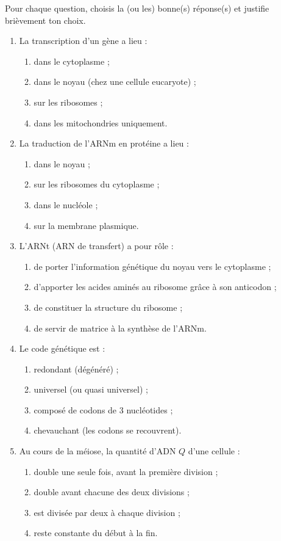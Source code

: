 \documentclass[11pt]{article}
\begin{document}
\begin{exercice}
Pour chaque question, choisis la (ou les) bonne(s) réponse(s) et justifie brièvement ton choix.
\begin{enumerate}
\item La transcription d'un gène a lieu :
\begin{enumerate}
\item dans le cytoplasme ;
\item dans le noyau (chez une cellule eucaryote) ;
\item sur les ribosomes ;
\item dans les mitochondries uniquement.
\end{enumerate}
\item La traduction de l'ARNm en protéine a lieu :
\begin{enumerate}
\item dans le noyau ;
\item sur les ribosomes du cytoplasme ;
\item dans le nucléole ;
\item sur la membrane plasmique.
\end{enumerate}
\item L'ARNt (ARN de transfert) a pour rôle :
\begin{enumerate}
\item de porter l'information génétique du noyau vers le cytoplasme ;
\item d'apporter les acides aminés au ribosome grâce à son anticodon ;
\item de constituer la structure du ribosome ;
\item de servir de matrice à la synthèse de l'ARNm.
\end{enumerate}
\item Le code génétique est :
\begin{enumerate}
\item redondant (dégénéré) ;
\item universel (ou quasi universel) ;
\item composé de codons de 3 nucléotides ;
\item chevauchant (les codons se recouvrent).
\end{enumerate}
\item Au cours de la méiose, la quantité d'ADN $Q$ d'une cellule :
\begin{enumerate}
\item double une seule fois, avant la première division ;
\item double avant chacune des deux divisions ;
\item est divisée par deux à chaque division ;
\item reste constante du début à la fin.
\end{enumerate}
\end{enumerate}
\end{exercice}
\end{document}
